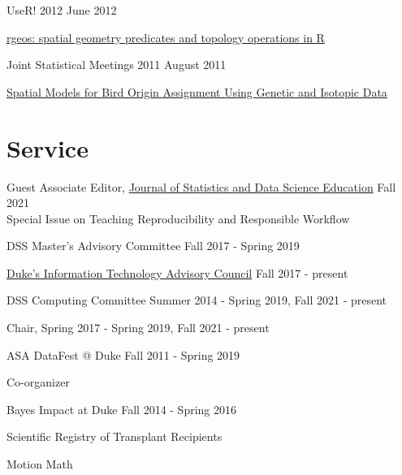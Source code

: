 \documentclass[margin,line]{res}
\begin{document}
\begin{resume}
UseR! 2012 \hfill June 2012
\begin{list1}
\item[] \href{https://github.com/rundel/Presentations/tree/master/UseR2012}{rgeos: spatial geometry predicates and topology operations in R}
\end{list1}
\vspace{-3mm}

Joint Statistical Meetings 2011 \hfill August 2011
\begin{list1}
\item[] \href{https://github.com/rundel/Presentations/tree/master/JSM%202011}{Spatial Models for Bird Origin Assignment Using Genetic and Isotopic Data}
\end{list1}
\vspace{-3mm}

\vspace{4mm}

\section{\sc Service}

Guest Associate Editor, \href{https://www.tandfonline.com/action/journalInformation?show=aimsScope&journalCode=ujse20}{Journal of Statistics and Data Science Education} \hfill Fall 2021\\
Special Issue on Teaching Reproducibility and Responsible Workflow

DSS Master's Advisory Committee \hfill Fall 2017 - Spring 2019

\href{http://services.duke.edu/itac/}{Duke's Information Technology Advisory Council} \hfill Fall 2017 - present

DSS Computing Committee \hfill Summer 2014 - Spring 2019, Fall 2021 - present
\begin{list1}
\item[] Chair, Spring 2017 - Spring 2019, Fall 2021 - present              
\end{list1}

ASA DataFest @ Duke \hfill Fall 2011 - Spring 2019
\begin{list1}
\item[] Co-organizer
\end{list1}


Bayes Impact at Duke \hfill Fall 2014 - Spring 2016
\begin{list1}
\item[] Scientific Registry of Transplant Recipients
\item[] Motion Math
\end{list1}



\end{resume}
\end{document}
